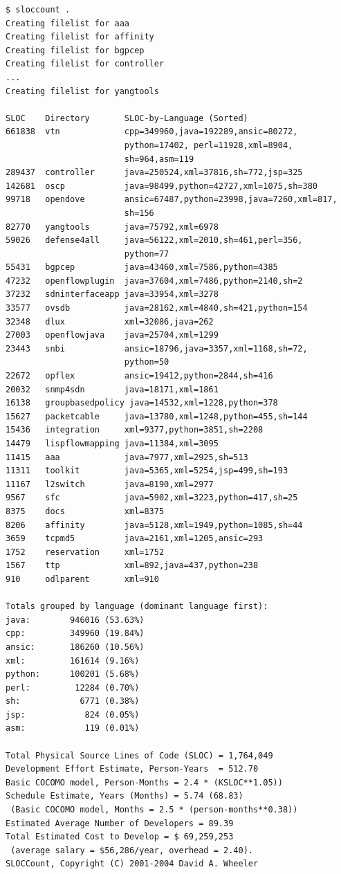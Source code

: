 \documentclass[a4paper, 12pt]{book}
\begin{document}
\begin{verbatim}
$ sloccount .
Creating filelist for aaa
Creating filelist for affinity
Creating filelist for bgpcep
Creating filelist for controller
...
Creating filelist for yangtools

SLOC    Directory       SLOC-by-Language (Sorted)
661838  vtn             cpp=349960,java=192289,ansic=80272,
                        python=17402, perl=11928,xml=8904,
                        sh=964,asm=119
289437  controller      java=250524,xml=37816,sh=772,jsp=325
142681  oscp            java=98499,python=42727,xml=1075,sh=380
99718   opendove        ansic=67487,python=23998,java=7260,xml=817,
                        sh=156
82770   yangtools       java=75792,xml=6978
59026   defense4all     java=56122,xml=2010,sh=461,perl=356,
                        python=77
55431   bgpcep          java=43460,xml=7586,python=4385
47232   openflowplugin  java=37604,xml=7486,python=2140,sh=2
37232   sdninterfaceapp java=33954,xml=3278
33577   ovsdb           java=28162,xml=4840,sh=421,python=154
32348   dlux            xml=32086,java=262
27003   openflowjava    java=25704,xml=1299
23443   snbi            ansic=18796,java=3357,xml=1168,sh=72,
                        python=50
22672   opflex          ansic=19412,python=2844,sh=416
20032   snmp4sdn        java=18171,xml=1861
16138   groupbasedpolicy java=14532,xml=1228,python=378
15627   packetcable     java=13780,xml=1248,python=455,sh=144
15436   integration     xml=9377,python=3851,sh=2208
14479   lispflowmapping java=11384,xml=3095
11415   aaa             java=7977,xml=2925,sh=513
11311   toolkit         java=5365,xml=5254,jsp=499,sh=193
11167   l2switch        java=8190,xml=2977
9567    sfc             java=5902,xml=3223,python=417,sh=25
8375    docs            xml=8375
8206    affinity        java=5128,xml=1949,python=1085,sh=44
3659    tcpmd5          java=2161,xml=1205,ansic=293
1752    reservation     xml=1752
1567    ttp             xml=892,java=437,python=238
910     odlparent       xml=910

Totals grouped by language (dominant language first):
java:        946016 (53.63%)
cpp:         349960 (19.84%)
ansic:       186260 (10.56%)
xml:         161614 (9.16%)
python:      100201 (5.68%)
perl:         12284 (0.70%)
sh:            6771 (0.38%)
jsp:            824 (0.05%)
asm:            119 (0.01%)

Total Physical Source Lines of Code (SLOC) = 1,764,049
Development Effort Estimate, Person-Years  = 512.70
Basic COCOMO model, Person-Months = 2.4 * (KSLOC**1.05))
Schedule Estimate, Years (Months) = 5.74 (68.83)
 (Basic COCOMO model, Months = 2.5 * (person-months**0.38))
Estimated Average Number of Developers = 89.39
Total Estimated Cost to Develop = $ 69,259,253
 (average salary = $56,286/year, overhead = 2.40).
SLOCCount, Copyright (C) 2001-2004 David A. Wheeler
\end{verbatim}
\end{document}
